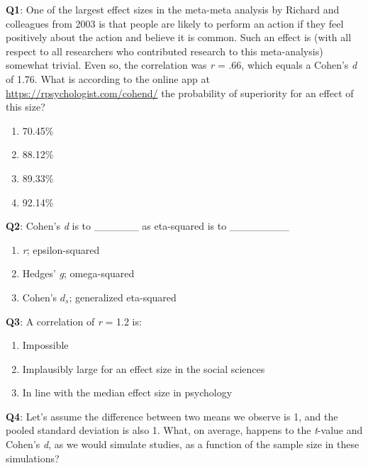 \documentclass[
  oneside]{krantz}
\providecommand{\tightlist}{%
  \setlength{\itemsep}{0pt}\setlength{\parskip}{0pt}}
\begin{document}
\textbf{Q1}: One of the largest effect sizes in the meta-meta analysis by Richard and colleagues from 2003 is that people are likely to perform an action if they feel positively about the action and believe it is common. Such an effect is (with all respect to all researchers who contributed research to this meta-analysis) somewhat trivial. Even so, the correlation was \emph{r} = .66, which equals a Cohen's \emph{d} of 1.76. What is according to the online app at \url{https://rpsychologist.com/cohend/} the probability of superiority for an effect of this size?

\begin{enumerate}
\def\labelenumi{\Alph{enumi})}
\tightlist
\item
  70.45\%
\item
  88.12\%
\item
  89.33\%
\item
  92.14\%
\end{enumerate}

\textbf{Q2}: Cohen's \emph{d} is to \_\_\_\_\_\_ as eta-squared is to \_\_\_\_\_\_\_\_

\begin{enumerate}
\def\labelenumi{\Alph{enumi})}
\tightlist
\item
  \emph{r}; epsilon-squared
\item
  Hedges' \emph{g}; omega-squared
\item
  Cohen's \(d_s\); generalized eta-squared
\end{enumerate}

\textbf{Q3}: A correlation of \emph{r} = 1.2 is:

\begin{enumerate}
\def\labelenumi{\Alph{enumi})}
\tightlist
\item
  Impossible
\item
  Implausibly large for an effect size in the social sciences
\item
  In line with the median effect size in psychology
\end{enumerate}

\textbf{Q4}: Let's assume the difference between two means we observe is 1, and the pooled standard deviation is also 1. What, on average, happens to the \emph{t}-value and Cohen's \emph{d}, as we would simulate studies, as a function of the sample size in these simulations?
\end{document}
